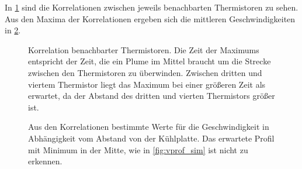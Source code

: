 In \cref{fig:korr} sind die Korrelationen zwischen jeweils benachbarten Thermistoren zu sehen. Aus den Maxima der Korrelationen ergeben sich die mittleren Geschwindigkeiten in \cref{fig:v_korr}.
\\
\begin{figure}
	\caption{Korrelation benachbarter Thermistoren. Die Zeit der Maximums entspricht der Zeit, die ein Plume im Mittel braucht um die Strecke zwischen den Thermistoren zu überwinden. Zwischen dritten und viertem Thermistor liegt das Maximum bei einer größeren Zeit als erwartet, da der Abstand des dritten und vierten Thermistors größer ist.}\label{fig:korr}
\end{figure}
\begin{figure}
	\caption{Aus den Korrelationen bestimmte Werte für die Geschwindigkeit in Abhängigkeit vom Abstand von der Kühlplatte. Das erwartete Profil mit Minimum in der Mitte, wie in \cref{fig:vprof_sim} ist nicht zu erkennen.}\label{fig:v_korr}
\end{figure}

%












